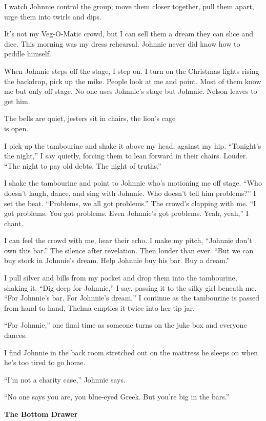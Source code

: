 \documentclass[
]{article}
\begin{document}
I watch Johnnie control the group; move them closer together, pull them
apart, urge them into twirls and dips.

It's not my Veg-O-Matic crowd, but I can sell them a dream they can
slice and dice. This morning was my dress rehearsal. Johnnie never did
know how to peddle himself.

When Johnnie steps off the stage, I step on. I turn on the Christmas
lights rising the backdrop, pick up the mike. People look at me and
point. Most of them know me but only off stage. No one uses Johnnie's
stage but Johnnie. Nelson leaves to get him.

The bells are quiet, jesters sit in chairs, the lion's cage\\
is open.

I pick up the tambourine and shake it above my head, against my hip.
``Tonight's the night,'' I say quietly, forcing them to lean forward in
their chairs. Louder. ``The night to pay old debts. The night of
truths.''

I shake the tambourine and point to Johnnie who's motioning me off
stage. ``Who doesn't laugh, dance, and sing with Johnnie. Who doesn't
tell him problems?'' I set the beat. ``Problems, we all got problems.''
The crowd's clapping with me. ``I got problems. You got problems. Even
Johnnie's got problems. Yeah, yeah,'' I chant.

I can feel the crowd with me, hear their echo. I make my pitch,
``Johnnie don't own this bar.'' The silence after revelation. Then
louder than ever. ``But we can buy stock in Johnnie's dream. Help
Johnnie buy his bar. Buy a dream.''

I pull silver and bills from my pocket and drop them into the
tambourine, shaking it. ``Dig deep for Johnnie,'' I say, passing it to
the silky girl beneath me. ``For Johnnie's bar. For Johnnie's dream,'' I
continue as the tambourine is passed from hand to hand, Thelma empties
it twice into her tip jar.

``For Johnnie,'' one final time as someone turns on the juke box and
everyone dances.

I find Johnnie in the back room stretched out on the mattress he sleeps
on when he's too tired to go home.

``I'm not a charity case,'' Johnnie says.

``No one says you are, you blue-eyed Greek. But you're big in the
bars.''

\textbf{\hfill\break
}

\textbf{The Bottom Drawer}
\end{document}
